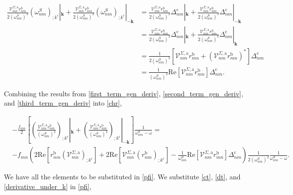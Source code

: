 \documentclass[11pt]{article}
\begin{document}
\begin{align}\label{third_term_gen_deriv}
\frac{\mathcal{V}^{\Sigma,\text{a}}_{mn}r^{\text{b}}_{nm}}{2(\omega^{S}_{nm})^{3}}\left(\omega^{S}_{nm}\right)_{;k^{\text{c}}}|_{\mathbf{k}} + \frac{\mathcal{V}^{\Sigma,\text{a}}_{mn}r^{\text{b}}_{nm}}{2(\omega^{S}_{nm})^{3}}\left(\omega^{S}_{nm}\right)_{;k^{\text{c}}}|_{-\mathbf{k}}
&= \frac{\mathcal{V}^{\Sigma,\text{a}}_{mn}r^{\text{b}}_{nm}}{2(\omega^{S}_{nm})^{3}}\Delta_{nm}^{\text{c}}|_{\mathbf{k}} + \frac{\mathcal{V}^{\Sigma,\text{a}}_{mn}r^{\text{b}}_{nm}}{2(\omega^{S}_{nm})^{3}}\Delta_{nm}^{\text{c}}|_{-\mathbf{k}}\nonumber\\
&= \frac{\mathcal{V}^{\Sigma,\text{a}}_{nm}r^{\text{b}}_{mn}}{2(\omega^{S}_{nm})^{3}}\Delta_{nm}^{\text{c}}|_{\mathbf{k}} + \frac{\mathcal{V}^{\Sigma,\text{a}}_{mn}r^{\text{b}}_{nm}}{2(\omega^{S}_{nm})^{3}}\Delta_{nm}^{\text{c}}|_{\mathbf{k}}\nonumber\\
&= \frac{1}{2(\omega^{S}_{nm})^{3}}\left[\mathcal{V}^{\Sigma,\text{a}}_{nm}r^{\text{b}}_{mn} + \left(\mathcal{V}^{\Sigma,\text{a}}_{nm}r^{\text{b}}_{mn}\right)^{*}\right]\Delta_{nm}^{\text{c}}\nonumber\\
&= \frac{1}{(\omega^{S}_{nm})^{3}}\mathrm{Re}\left[\mathcal{V}^{\Sigma,\text{a}}_{nm}r^{\text{b}}_{mn}\right]\Delta_{nm}^{\text{c}}.
\end{align}

Combining the results from \eqref{first_term_gen_deriv}, \eqref{second_term_gen_deriv}, and \eqref{third_term_gen_deriv} into \eqref{chr},

\begin{align}\label{derivative_under_k}
&-\frac{f_{mn}}{2}\left[\left(\frac{\mathcal{V}^{\Sigma,\text{a}}_{mn}r^{\text{b}}_{nm}}{(\omega^S_{nm})^2}\right)_{;k^{\text{c}}}|_{\mathbf{k}} + \left(\frac{\mathcal{V}^{\Sigma,\text{a}}_{mn}r^{\text{b}}_{nm}}{(\omega^S_{nm})^2}\right)_{;k^{\text{c}}}|_{-\mathbf{k}}\right]\frac{1}{\omega^S_{nm}-\omega} = \nonumber\\
&-f_{mn}\left(2\mathrm{Re}\left[r^{\text{b}}_{nm}\left(\mathcal{V}^{\Sigma,\text{a}}_{mn}\right)_{;k^{\text{c}}}\right] + 2\mathrm{Re}\left[\mathcal{V}^{\Sigma,\text{a}}_{mn}\left(r^{\text{b}}_{nm}\right)_{;k^{\text{c}}}\right] - \frac{1}{\omega^{S}_{nm}}\mathrm{Re}\left[\mathcal{V}^{\Sigma,\text{a}}_{nm}r^{\text{b}}_{mn}\right]\Delta_{nm}^{\text{c}}\right)\frac{1}{2(\omega^{S}_{nm})^{2}}\frac{1}{\omega^S_{nm}-\omega}.
\end{align}

We have all the elements to be substituted in \eqref{pfi}. We substitute \eqref{ct}, \eqref{dt}, and \eqref{derivative_under_k} in \eqref{pfi},
\end{document}
